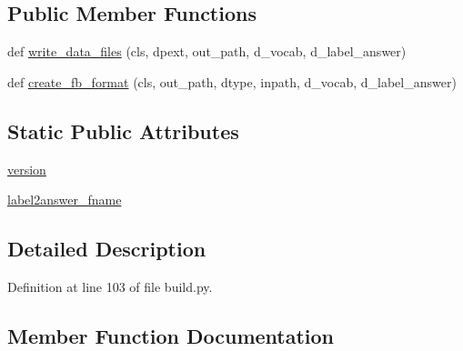 \subsection*{Public Member Functions}
\begin{DoxyCompactItemize}
\item 
def \hyperlink{classparlai_1_1tasks_1_1insuranceqa_1_1build_1_1ParseInsuranceQAV1_aec860cdc7404febddbbc3434828c74e3}{write\+\_\+data\+\_\+files} (cls, dpext, out\+\_\+path, d\+\_\+vocab, d\+\_\+label\+\_\+answer)
\item 
def \hyperlink{classparlai_1_1tasks_1_1insuranceqa_1_1build_1_1ParseInsuranceQAV1_a67191000b24f2d3f3be641c5221b9a30}{create\+\_\+fb\+\_\+format} (cls, out\+\_\+path, dtype, inpath, d\+\_\+vocab, d\+\_\+label\+\_\+answer)
\end{DoxyCompactItemize}
\subsection*{Static Public Attributes}
\begin{DoxyCompactItemize}
\item 
\hyperlink{classparlai_1_1tasks_1_1insuranceqa_1_1build_1_1ParseInsuranceQAV1_a66e7019fee43e41701b7a05bbb9bc4b4}{version}
\item 
\hyperlink{classparlai_1_1tasks_1_1insuranceqa_1_1build_1_1ParseInsuranceQAV1_a978e1523d83ec092a9be4f53e6faf7ec}{label2answer\+\_\+fname}
\end{DoxyCompactItemize}


\subsection{Detailed Description}


Definition at line 103 of file build.\+py.



\subsection{Member Function Documentation}
\mbox{\label{classparlai_1_1tasks_1_1insuranceqa_1_1build_1_1ParseInsuranceQAV1_a67191000b24f2d3f3be641c5221b9a30}} 
